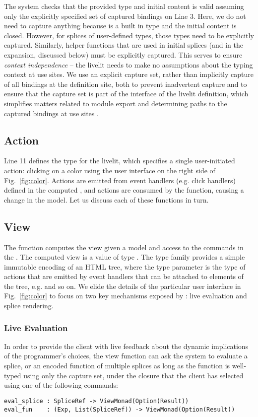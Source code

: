 The system checks that the provided type and initial content is valid 
assuming only the explicitly specified set of captured bindings on Line 3.
Here, we do not need to capture anything because  is a built in type
and the initial content is closed. However, 
for splices of user-defined types, those types need to be explicitly captured.
Similarly, helper functions that are used in initial splices (and in the expansion,
discussed below) must be explicitly captured. 
This serves to ensure \emph{context independence} -- the livelit needs to make no 
assumptions about the typing context at use sites.
We use an explicit capture set, rather than implicitly capture of all bindings at the definition site, 
both to prevent inadvertent capture 
and to ensure that the capture set is part
of the interface of the livelit definition, which simplifies matters related to 
module export and determining paths to the captured bindings at use sites \cite{TLMs}.

\subsection{Action}
Line 11 defines the  type for the  livelit, which 
specifies a single user-initiated action: clicking on a color using the user 
interface on the right side of Fig.~\ref{fig:color}. Actions are emitted
from event handlers (e.g. click handlers) defined in the computed , 
and actions are consumed by the  function, causing a change in the model. 
Let us discuss each of these functions in turn.

\subsection{View}
The  function computes the view given a model and access to the commands in 
the . The computed view is a value of type .  
The type family  provides a simple immutable
encoding of an HTML tree, where the type parameter  is the type of actions that 
are emitted by event handlers that can be attached to elements of the tree, e.g.
 and so on. 
We elide the details of the particular user interface in Fig.~\ref{fig:color}
to focus on two key mechanisms exposed by : live evaluation 
and splice rendering.

\subsubsection{Live Evaluation}
In order to provide the client with live feedback about the dynamic implications 
of the programmer's choices, 
the view function can ask the system to evaluate a splice, or an encoded function of 
multiple splices as long as the function is well-typed using only the capture set, 
under the closure that the client has selected using one of the following
commands:
\begin{lstlisting}[numbers=none]
eval_splice : SpliceRef -> ViewMonad(Option(Result))
eval_fun    : (Exp, List(SpliceRef)) -> ViewMonad(Option(Result))
\end{lstlisting}


